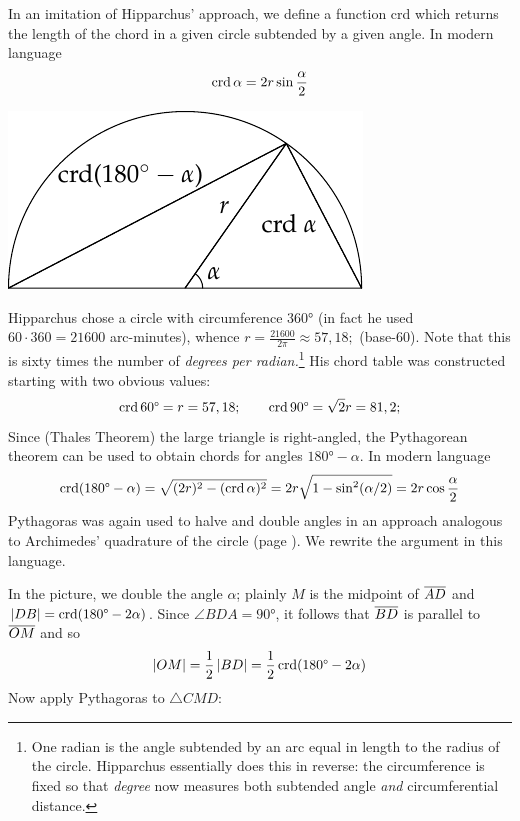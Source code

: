\begin{minipage}[t]{0.63\linewidth}\vspace{0pt}
	In an imitation of Hipparchus' approach, we define a function crd which returns the length of the chord in a given circle subtended by a given angle. In modern language
	\[
		\crd\alpha=2r\sin\frac\alpha 2
	\]
\end{minipage}
\hfill
\begin{minipage}[t]{0.36\linewidth}\vspace{-10pt}
	\flushright\includegraphics[scale=0.9]{trig-chord}
\end{minipage}\medbreak
Hipparchus chose a circle with circumference \ang{360} (in fact he used $60\cdot 360=21600$ arc-minutes), whence $r=\frac{21600}{2\pi}\approx 57,18;$ (base-60). Note that this is sixty times the number of \emph{degrees per radian.}\footnote{%
	One radian is the angle subtended by an arc equal in length to the radius of the circle. Hipparchus essentially does this in reverse: the circumference is fixed so that \emph{degree} now measures both subtended angle \emph{and} circumferential distance.%
} His chord table was constructed starting with two obvious values:
\[
	\crd \ang{60}=r=57,18;\qquad \crd \ang{90}=\sqrt 2r=81,2;
\]
Since (Thales Theorem) the large triangle is right-angled, the Pythagorean theorem can be used to obtain chords for angles $\ang{180}-\alpha$. In modern language
\[
	\crd(\ang{180}-\alpha) =\sqrt{(2r)^2-(\crd\alpha)^2} =2r\sqrt{1-\sin^2(\alpha/2)} =2r\cos\frac\alpha 2
	\]
Pythagoras was again used to halve and double angles in an approach analogous to Archimedes' quadrature of the circle (page \pageref{pg:archquadcircle}). We rewrite the argument in this language.\par
\begin{minipage}[t]{0.6\linewidth}\vspace{0pt}
	In the picture, we double the angle $\alpha$; plainly $M$ is the midpoint of $\cl{AD}$ and $\nm{DB}=\crd(\ang{180}-2\alpha)$. Since $\angle BDA=\ang{90}$, it follows that $\cl{BD}$ is parallel to $\cl{OM}$ and so
	\[
		\nm{OM}=\frac 12\nm{BD}=\frac 12\crd(\ang{180}-2\alpha)
	\]
	Now apply Pythagoras to $\triangle CMD$:
\end{minipage}
